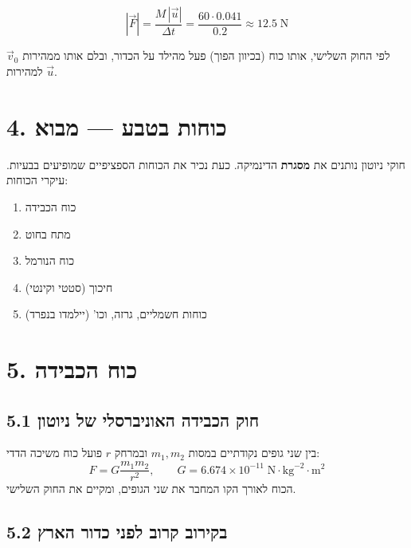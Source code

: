 \documentclass[12pt, a4paper]{article}
\newcommand{\hvec}[1]{\overrightarrow{#1}}
\begin{document}
\begin{tcolorbox}[resultbox]
\[
  |\hvec{F}| = \frac{M\,|\hvec{u}|}{\Delta t}
  = \frac{60 \cdot 0.041}{0.2}
  \approx 12.5\;\text{N}
\]
\end{tcolorbox}

לפי החוק השלישי, אותו כוח (בכיוון הפוך) פעל מהילד על הכדור, ובלם אותו ממהירות \textenglish{$\hvec{v}_0$} למהירות \textenglish{$\hvec{u}$}.

\section*{4. כוחות בטבע --- מבוא}

חוקי ניוטון נותנים את \textbf{מסגרת} הדינמיקה. כעת נכיר את הכוחות הספציפיים שמופיעים בבעיות. עיקרי הכוחות:
\begin{enumerate}
  \item כוח הכבידה
  \item מתח בחוט
  \item כוח הנורמל
  \item חיכוך (סטטי וקינטי)
  \item כוחות חשמליים, גרזה, וכו' (יילמדו בנפרד)
\end{enumerate}

\section*{5. כוח הכבידה}

\subsection*{5.1 חוק הכבידה האוניברסלי של ניוטון}

\begin{tcolorbox}[defbox]
בין שני גופים נקודתיים במסות \textenglish{$m_1, m_2$} ובמרחק \textenglish{$r$} פועל כוח משיכה הדדי:
\[
  F = G\frac{m_1 m_2}{r^2},
  \qquad
  G = 6.674 \times 10^{-11}\;\text{N}\cdot\text{kg}^{-2}\cdot\text{m}^2
\]
הכוח לאורך הקו המחבר את שני הגופים, ומקיים את החוק השלישי.
\end{tcolorbox}

\subsection*{5.2 בקירוב קרוב לפני כדור הארץ}
\end{document}
